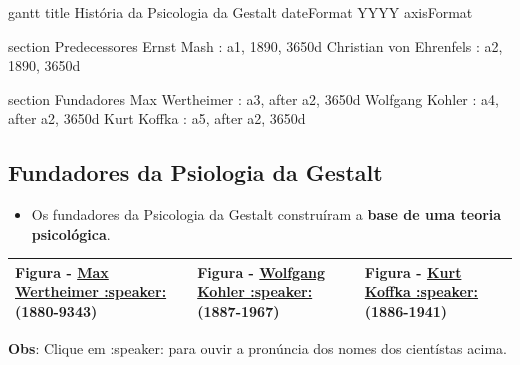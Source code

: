 \documentclass[
]{book}
\newenvironment{Shaded}{\begin{snugshade}}{\end{snugshade}}
\newcommand{\NormalTok}[1]{#1}
\providecommand{\tightlist}{%
  \setlength{\itemsep}{0pt}\setlength{\parskip}{0pt}}
\begin{document}
\begin{Shaded}
\begin{Highlighting}[]
\NormalTok{gantt}
\NormalTok{    title História da Psicologia da Gestalt}
\NormalTok{    dateFormat  YYYY}
\NormalTok{    axisFormat  }
    
\NormalTok{    section Predecessores}
\NormalTok{    Ernst Mash : a1, 1890, 3650d}
\NormalTok{    Christian von Ehrenfels : a2, 1890, 3650d}
    
\NormalTok{    section Fundadores}
\NormalTok{    Max Wertheimer       : a3, after a2, 3650d}
\NormalTok{    Wolfgang Kohler      : a4, after a2, 3650d}
\NormalTok{    Kurt Koffka                  : a5, after a2, 3650d}
\end{Highlighting}
\end{Shaded}

\hypertarget{fundadores-da-psiologia-da-gestalt}{%
\subsection{Fundadores da Psiologia da Gestalt}\label{fundadores-da-psiologia-da-gestalt}}

\begin{itemize}
\tightlist
\item
  Os fundadores da Psicologia da Gestalt construíram a \textbf{base de uma teoria psicológica}.
\end{itemize}

\begin{longtable}[]{@{}
  >{\centering\arraybackslash}p{}
  >{\centering\arraybackslash}p{}
  >{\centering\arraybackslash}p{}@{}}
\toprule()
\endhead
Figura - \href{https://translate.google.com/?sl=hu\&tl=pt\&text=Max\%20Wertheimer\&op=translate}{Max Wertheimer :speaker:} (1880-9343) & Figura - \href{https://translate.google.com/?sl=de\&tl=pt\&text=Wolfgang\%20Kohler\&op=translate}{Wolfgang Kohler :speaker:}(1887-1967) & Figura - \href{https://translate.google.com/?sl=de\&tl=pt\&text=Kurt\%20Koffka\&op=translate}{Kurt Koffka :speaker:}(1886-1941) \\
\bottomrule()
\end{longtable}

\textbf{Obs}: Clique em :speaker: para ouvir a pronúncia dos nomes dos cientístas acima.
\end{document}
